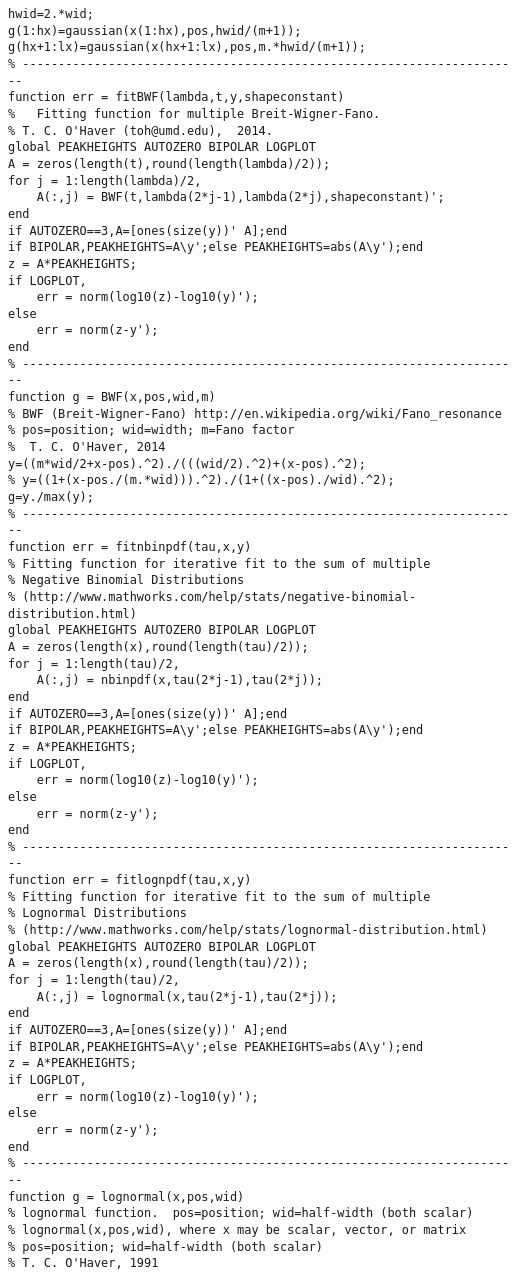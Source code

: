 \begin{lstlisting}
hwid=2.*wid;
g(1:hx)=gaussian(x(1:hx),pos,hwid/(m+1));
g(hx+1:lx)=gaussian(x(hx+1:lx),pos,m.*hwid/(m+1));
% ----------------------------------------------------------------------
function err = fitBWF(lambda,t,y,shapeconstant)
%   Fitting function for multiple Breit-Wigner-Fano.
% T. C. O'Haver (toh@umd.edu),  2014.
global PEAKHEIGHTS AUTOZERO BIPOLAR LOGPLOT
A = zeros(length(t),round(length(lambda)/2));
for j = 1:length(lambda)/2,
    A(:,j) = BWF(t,lambda(2*j-1),lambda(2*j),shapeconstant)';
end
if AUTOZERO==3,A=[ones(size(y))' A];end
if BIPOLAR,PEAKHEIGHTS=A\y';else PEAKHEIGHTS=abs(A\y');end
z = A*PEAKHEIGHTS;
if LOGPLOT,
    err = norm(log10(z)-log10(y)');
else
    err = norm(z-y');
end
% ----------------------------------------------------------------------
function g = BWF(x,pos,wid,m)
% BWF (Breit-Wigner-Fano) http://en.wikipedia.org/wiki/Fano_resonance
% pos=position; wid=width; m=Fano factor
%  T. C. O'Haver, 2014
y=((m*wid/2+x-pos).^2)./(((wid/2).^2)+(x-pos).^2);
% y=((1+(x-pos./(m.*wid))).^2)./(1+((x-pos)./wid).^2);
g=y./max(y);
% ----------------------------------------------------------------------
function err = fitnbinpdf(tau,x,y)
% Fitting function for iterative fit to the sum of multiple
% Negative Binomial Distributions
% (http://www.mathworks.com/help/stats/negative-binomial-distribution.html)
global PEAKHEIGHTS AUTOZERO BIPOLAR LOGPLOT
A = zeros(length(x),round(length(tau)/2));
for j = 1:length(tau)/2,
    A(:,j) = nbinpdf(x,tau(2*j-1),tau(2*j));
end
if AUTOZERO==3,A=[ones(size(y))' A];end
if BIPOLAR,PEAKHEIGHTS=A\y';else PEAKHEIGHTS=abs(A\y');end
z = A*PEAKHEIGHTS;
if LOGPLOT,
    err = norm(log10(z)-log10(y)');
else
    err = norm(z-y');
end
% ----------------------------------------------------------------------
function err = fitlognpdf(tau,x,y)
% Fitting function for iterative fit to the sum of multiple
% Lognormal Distributions
% (http://www.mathworks.com/help/stats/lognormal-distribution.html)
global PEAKHEIGHTS AUTOZERO BIPOLAR LOGPLOT
A = zeros(length(x),round(length(tau)/2));
for j = 1:length(tau)/2,
    A(:,j) = lognormal(x,tau(2*j-1),tau(2*j));
end
if AUTOZERO==3,A=[ones(size(y))' A];end
if BIPOLAR,PEAKHEIGHTS=A\y';else PEAKHEIGHTS=abs(A\y');end
z = A*PEAKHEIGHTS;
if LOGPLOT,
    err = norm(log10(z)-log10(y)');
else
    err = norm(z-y');
end
% ----------------------------------------------------------------------
function g = lognormal(x,pos,wid)
% lognormal function.  pos=position; wid=half-width (both scalar)
% lognormal(x,pos,wid), where x may be scalar, vector, or matrix
% pos=position; wid=half-width (both scalar)
% T. C. O'Haver, 1991  

\end{lstlisting}
